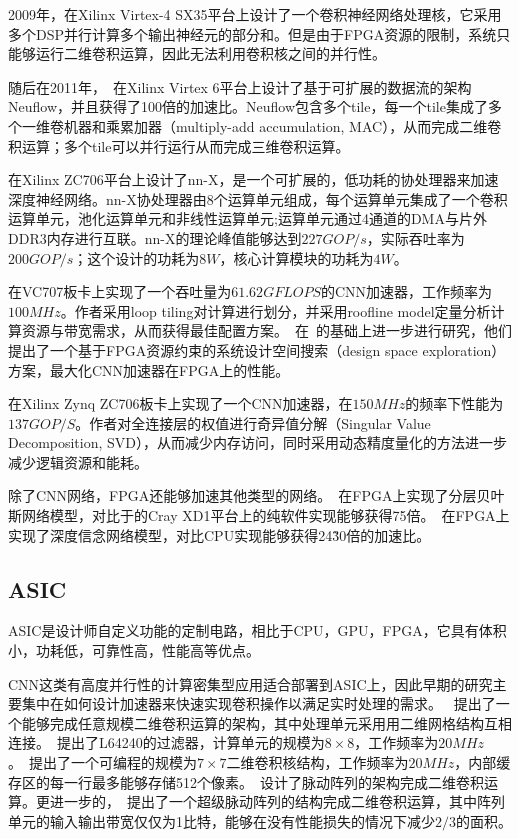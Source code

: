 2009年，\citet{farabet2009cnp}在Xilinx Virtex-4 SX35平台上设计了一个卷积神经网络处理核，它采用多个DSP并行计算多个输出神经元的部分和。但是由于FPGA资源的限制，系统只能够运行二维卷积运算，因此无法利用卷积核之间的并行性。

随后在2011年，~\citet{farabet2011neuflow}在Xilinx Virtex 6平台上设计了基于可扩展的数据流的架构Neuflow，并且获得了100倍的加速比。Neuflow包含多个tile，每一个tile集成了多个一维卷机器和乘累加器（multiply-add accumulation, MAC），从而完成二维卷积运算；多个tile可以并行运行从而完成三维卷积运算。

\citet{gokhale2014240}在Xilinx ZC706平台上设计了nn-X，是一个可扩展的，低功耗的协处理器来加速深度神经网络。nn-X协处理器由8个运算单元组成，每个运算单元集成了一个卷积运算单元，池化运算单元和非线性运算单元;运算单元通过4通道的DMA与片外DDR3内存进行互联。nn-X的理论峰值能够达到$227GOP/s$，实际吞吐率为$200GOP/s$；这个设计的功耗为$8W$，核心计算模块的功耗为$4W$。

\citet{zhang2015optimizing}在VC707板卡上实现了一个吞吐量为$61.62GFLOPS$的CNN加速器，工作频率为$100MHz$。作者采用loop tiling对计算进行划分，并采用roofline model定量分析计算资源与带宽需求，从而获得最佳配置方案。~\citet{suda2016throughput}在~\citet{zhang2015optimizing}的基础上进一步进行研究，他们提出了一个基于FPGA资源约束的系统设计空间搜索（design space exploration）方案，最大化CNN加速器在FPGA上的性能。

\citet{qiu2016going}在Xilinx Zynq ZC706板卡上实现了一个CNN加速器，在$150MHz$的频率下性能为$137GOP/S$。作者对全连接层的权值进行奇异值分解（Singular Value Decomposition, SVD），从而减少内存访问，同时采用动态精度量化的方法进一步减少逻辑资源和能耗。

除了CNN网络，FPGA还能够加速其他类型的网络。~\citet{rice2009scaling}在FPGA上实现了分层贝叶斯网络模型，对比于的Cray XD1平台上的纯软件实现能够获得75倍。~\citet{kim2009highly}在FPGA上实现了深度信念网络模型，对比CPU实现能够获得24\~30倍的加速比。

\subsection{ASIC}
ASIC是设计师自定义功能的定制电路，相比于CPU，GPU，FPGA，它具有体积小，功耗低，可靠性高，性能高等优点。

CNN这类有高度并行性的计算密集型应用适合部署到ASIC上，因此早期的研究主要集中在如何设计加速器来快速实现卷积操作以满足实时处理的需求。
~\citet{lee1987parallel}提出了一个能够完成任意规模二维卷积运算的架构，其中处理单元采用用二维网格结构互相连接。~\citet{stearns1988reconfigurable}提出了L64240的过滤器，计算单元的规模为$8\times 8$，工作频率为$20MHz$。~\citet{kamp1990programmable}提出了一个可编程的规模为$7\times 7$二维卷积核结构，工作频率为$20MHz$，内部缓存区的每一行最多能够存储512个像素。~\citet{hecht1991advanced}设计了脉动阵列的架构完成二维卷积运算。更进一步的，~\citet{lee2006super}提出了一个超级脉动阵列的结构完成二维卷积运算，其中阵列单元的输入输出带宽仅仅为1比特，能够在没有性能损失的情况下减少$2/3$的面积。

